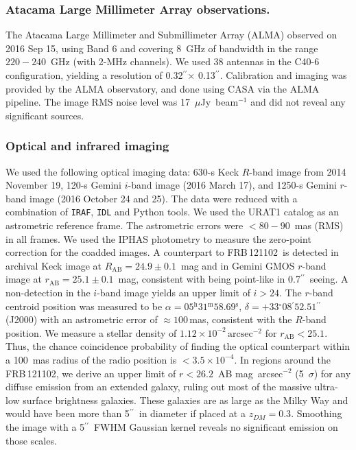 \documentclass{nature_frb}
\newcommand{\frb}{FRB\,121102}
\newcommand{\uJy}{$\mu$Jy}
\newcommand{\arcsec}{\ensuremath{^{\prime\prime}}}
\newcommand{\arcmin}{\ensuremath{^{\prime}}}
\newcommand{\degree}{\ensuremath{^\circ}}
\newcommand{\hs}{\ensuremath{^{\mathrm{s}}}}
\newcommand{\hm}{\ensuremath{^{\mathrm{m}}}}
\newcommand{\hh}{\ensuremath{^{\mathrm{h}}}}
\begin{document}
\subsubsection*{Atacama Large Millimeter Array observations.}
The Atacama Large Millimeter and Submillimeter Array (ALMA) observed on 2016 Sep 15, using Band 6 and covering 8~GHz of bandwidth in the range $220-240$~GHz (with 2-MHz channels).
We used 38 antennas in the C40-6 configuration, yielding a resolution of 0.32\arcsec $\times$ 0.13\arcsec.
Calibration and imaging was provided by the ALMA observatory, and done using CASA via the ALMA pipeline.
The image RMS noise level was 17~\uJy~beam$^{-1}$ and did not reveal any significant sources.

\subsubsection*{Optical and infrared imaging}
We used the following optical imaging data: 630-s Keck $R$-band image from 2014 November 19, 120-s Gemini $i$-band image (2016 March 17), and 1250-s Gemini $r$-band image (2016 October 24 and 25). The data were reduced with a combination of \texttt{IRAF}, \texttt{IDL} and {Python} tools. We used the URAT1 catalog\cite{zfs+2015} as an astrometric reference frame. The astrometric errors were $<80-90$~mas (RMS) in all frames. We used the IPHAS photometry\cite{dgi+2005} to measure the zero-point correction for the coadded images. A counterpart to \frb\ is detected in archival Keck image at $R_\mathrm{AB}=24.9\pm0.1$~mag and in Gemini GMOS $r$-band image at $r_\mathrm{AB}=25.1\pm0.1$~mag, consistent with being point-like in 0.7\arcsec\ seeing. A non-detection in the $i$-band image yields an upper limit of $i>24$. The $r$-band centroid position was measured to be $\alpha = 05\hh31\hm58.69\hs$, $\delta = +33\degree08\arcmin52.51\arcsec$ (J2000) with an astrometric error of $\approx 100$\,mas, consistent with the $R$-band position. We measure a stellar density of $1.12\times10^{-2}\,\mathrm{arcsec^{-2}}$ for $r_\mathrm{AB}<25.1$. Thus, the chance coincidence probability of finding the optical counterpart within a 100~mas radius of the radio position is $< 3.5 \times 10^{-4}$. In regions around the \frb, we derive an upper limit of $r < 26.2$~AB mag~arcsec$^{-2}$ (5~$\sigma$) for any diffuse emission from an extended galaxy, ruling out most of the massive ultra-low surface brightness galaxies\cite{vda+2015}. These galaxies are as large as the Milky Way and would have been more than 5\arcsec\ in diameter if placed at a $z_{DM}=0.3$. Smoothing the image with a 5\arcsec\ FWHM Gaussian kernel reveals no significant emission on those scales.
\end{document}
